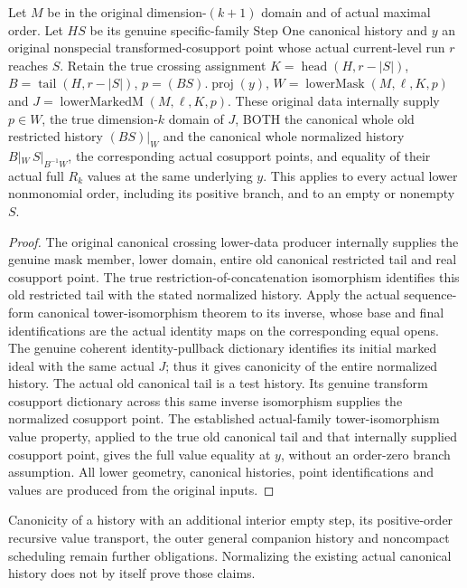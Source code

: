 \begin{theorem}
\label{hir:original-canonical-crossing-normalized-lower-data}
\leanok
{}
Let $M$ be in the original dimension-$(k+1)$ domain and of actual maximal
order.  Let $HS$ be its genuine specific-family Step One canonical
history and $y$ an original nonspecial transformed-cosupport point whose
actual current-level run $r$ reaches $S$.  Retain the true crossing
assignment $K=\operatorname{head}(H,r-|S|)$,
$B=\operatorname{tail}(H,r-|S|)$, $p=(BS).\operatorname{proj}(y)$,
$W=\operatorname{lowerMask}(M,\ell,K,p)$ and
$J=\operatorname{lowerMarkedM}(M,\ell,K,p)$.
These original data internally supply $p\in W$, the true dimension-$k$
domain of $J$, BOTH the canonical whole old restricted history $(BS)|_W$
and the canonical whole normalized history
$B|_W\,S|_{B^{-1}W}$, the corresponding actual cosupport points, and
equality of their actual full $R_k$ values at the same underlying $y$.
This applies to every actual lower nonmonomial order, including its
positive branch, and to an empty or nonempty $S$.
\end{theorem}
\begin{proof}
The original canonical crossing lower-data producer internally supplies
the genuine mask member, lower domain, entire old canonical restricted
tail and real cosupport point.  The true restriction-of-concatenation
isomorphism identifies this old restricted tail with the stated
normalized history.  Apply the actual sequence-form canonical tower-isomorphism theorem to its inverse,
whose base and final identifications are the actual identity maps on
the corresponding equal opens.  The genuine coherent identity-pullback
dictionary identifies its initial marked ideal with the same actual $J$;
thus it gives canonicity of the entire normalized history.  The actual
old canonical tail is a test history.  Its genuine transform cosupport
dictionary across this same inverse isomorphism supplies the normalized
cosupport point.  The established actual-family tower-isomorphism value
property, applied to the true old canonical tail and that internally
supplied cosupport point, gives the full value equality at $y$, without
an order-zero branch assumption.  All lower geometry, canonical histories,
point identifications and values are produced from the original inputs.
\end{proof}

Canonicity of a history with an additional interior empty step, its
positive-order recursive value transport, the outer general companion
history and noncompact scheduling remain further obligations.  Normalizing
the existing actual canonical history does not by itself prove those claims.
